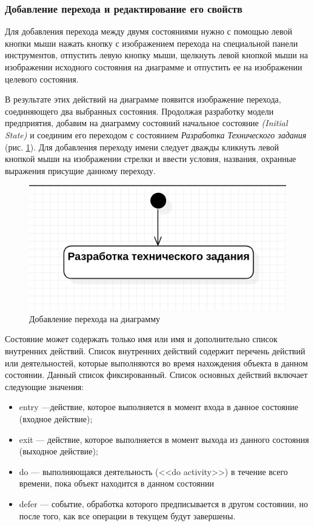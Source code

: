 \documentclass[a4paper,12pt]{report}
\begin{document}
\subsubsection*{Добавление перехода и редактирование его свойств}
Для добавления перехода между двумя состояниями нужно с помощью левой кнопки мыши нажать кнопку с изображением перехода на специальной панели инструментов, отпустить левую кнопку мыши, щелкнуть левой кнопкой мыши на изображении исходного состояния на диаграмме и отпустить ее на изображении целевого состояния. 

В результате этих действий на диаграмме появится изображение перехода, соединяющего два выбранных состояния. Продолжая разработку модели предприятия, добавим на диаграмму состояний начальное состояние \textit{(Initial State)} и соединим его переходом с состоянием \textit{Разработка Технического задания} (рис. \ref{fig:statechartfirst}). Для добавления переходу имени следует дважды кликнуть левой кнопкой мыши на изображении стрелки и ввести условия, названия, охранные выражения присущие данному переходу.

\begin{figure}[h!]
	\centering
	\includegraphics[width=0.5\linewidth]{images/statechartfirst}
	\caption{Добавление перехода на диаграмму}
	\label{fig:statechartfirst}
\end{figure}

Состояние может содержать только имя или имя и дополнительно список внутренних действий. Список внутренних действий содержит перечень действий или деятельностей, которые выполняются во время нахождения объекта в данном состоянии. Данный список фиксированный. Список основных действий включает следующие значения:
\begin{itemize}
	\item entry ---действие, которое выполняется в момент входа в данное состояние (входное действие);
	\item exit --- действие, которое выполняется в момент выхода из данного состояния (выходное действие);
	\item do --- выполняющаяся деятельность (<<do activity>>) в течение всего времени, пока объект находится в данном состоянии
	\item defer --- событие, обработка которого предписывается в другом состоянии, но после того, как все операции в текущем будут завершены.
\end{itemize}
\end{document}
